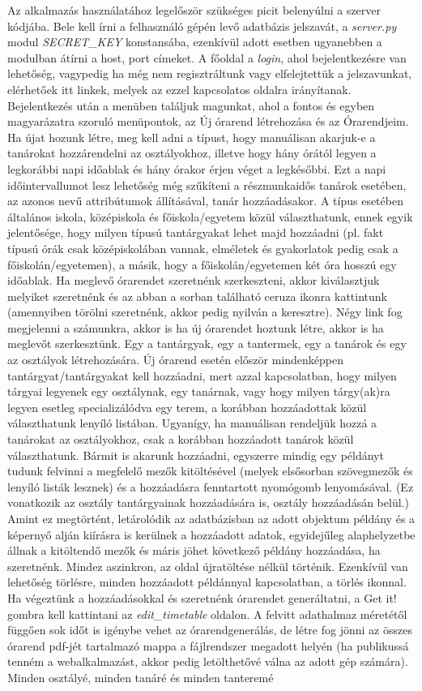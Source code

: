 Az alkalmazás használatához legelőször szükséges picit belenyúlni a szerver kódjába. Bele kell írni a felhasználó gépén levő adatbázis jelszavát, a \textit{server.py} modul \textit{SECRET_KEY} konstansába, ezenkívül adott esetben ugyanebben a modulban átírni a host, port címeket. A főoldal a \textit{login}, ahol bejelentkezésre van lehetőség, vagypedig ha még nem regisztráltunk vagy elfelejtettük a jelszavunkat, elérhetőek itt linkek, melyek az ezzel kapcsolatos oldalra irányítanak. Bejelentkezés után a menüben találjuk magunkat, ahol a fontos és egyben magyarázatra szoruló menüpontok, az Új órarend létrehozása és az Órarendjeim. Ha újat hozunk létre, meg kell adni a típust, hogy manuálisan akarjuk-e a tanárokat hozzárendelni az osztályokhoz, illetve hogy hány órától legyen a legkorábbi napi időablak és hány órakor érjen véget a legkésőbbi. Ezt a napi időintervallumot lesz lehetőség még szűkíteni a részmunkaidős tanárok esetében, az azonos nevű attribútumok állításával, tanár hozzáadásakor. A típus esetében általános iskola, középiskola és főiskola/egyetem közül választhatunk, ennek egyik jelentősége, hogy milyen típusú tantárgyakat lehet majd hozzáadni (pl. fakt típusú órák csak középiskolában vannak, elméletek és gyakorlatok pedig csak a főiskolán/egyetemen), a másik, hogy a főiskolán/egyetemen két óra hosszú egy időablak. Ha meglevő órarendet szeretnénk szerkeszteni, akkor kiválasztjuk melyiket szeretnénk és az abban a sorban található ceruza ikonra kattintunk (amennyiben törölni szeretnénk, akkor pedig nyilván a keresztre). Négy link fog megjelenni a számunkra, akkor is ha új órarendet hoztunk létre, akkor is ha meglevőt szerkesztünk. Egy a tantárgyak, egy a tantermek, egy a tanárok és egy az osztályok létrehozására. Új órarend esetén először mindenképpen tantárgyat/tantárgyakat kell hozzáadni, mert azzal kapcsolatban, hogy milyen tárgyai legyenek egy osztálynak, egy tanárnak, vagy hogy milyen tárgy(ak)ra legyen esetleg specializálódva egy terem, a korábban hozzáadottak közül választhatunk lenyíló listában. Ugyanígy, ha manuálisan rendeljük hozzá a tanárokat az osztályokhoz, csak a korábban hozzáadott tanárok közül választhatunk. Bármit is akarunk hozzáadni, egyszerre mindig egy példányt tudunk felvinni a megfelelő mezők kitöltésével (melyek elsősorban szövegmezők és lenyíló listák lesznek) és a hozzáadásra fenntartott nyomógomb lenyomásával. (Ez vonatkozik az osztály tantárgyainak hozzáadására is, osztály hozzáadásán belül.) Amint ez megtörtént, letárolódik az adatbázisban az adott objektum példány és a képernyő alján kiírásra is kerülnek a hozzáadott adatok, egyidejűleg alaphelyzetbe állnak a kitöltendő mezők és máris jöhet következő példány hozzáadása, ha szeretnénk. Mindez aszinkron, az oldal újratöltése nélkül történik. Ezenkívül van lehetőség törlésre, minden hozzáadott példánnyal kapcsolatban, a törlés ikonnal. Ha végeztünk a hozzáadásokkal és szeretnénk órarendet generáltatni, a Get it! gombra kell kattintani az \textit{edit\_timetable} oldalon. A felvitt adathalmaz méretétől függően sok időt is igénybe vehet az órarendgenerálás, de létre fog jönni az összes órarend pdf-jét tartalmazó mappa a fájlrendszer megadott helyén (ha publikussá tenném a webalkalmazást, akkor pedig letölthetővé válna az adott gép számára). Minden osztályé, minden tanáré és minden tanteremé 